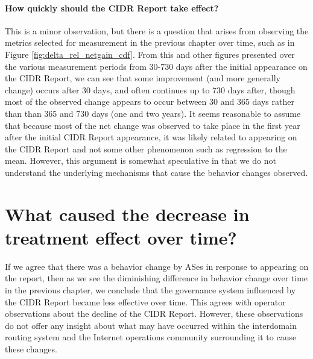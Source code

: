 \paragraph{How quickly should the CIDR Report take effect?}

This is a minor observation, but there is a question that arises from observing
the metrics selected for measurement in the previous chapter over time, such as
in Figure \ref{fig:delta_rel_netgain_cdf}. From this and other figures
presented over the various measurement periods from 30-730 days after the
initial appearance on the CIDR Report, we can see that some improvement (and
more generally change) occurs after 30 days, and often continues up to 730 days
after, though most of the observed change appears to occur between 30 and 365
days rather than than 365 and 730 days (one and two years). It seems reasonable
to assume that because most of the net change was observed to take place in the
first year after the initial CIDR Report appearance, it was likely related to
appearing on the CIDR Report and not some other phenomenon such as regression
to the mean. However, this argument is somewhat speculative in that we do not
understand the underlying mechanisms that cause the behavior changes observed.


\section{What caused the decrease in treatment effect over time?}
If we agree that there was a behavior change by ASes in response to appearing
on the report, then as we see the diminishing difference in behavior change
over time in the previous chapter, we conclude that the governance system
influenced by the CIDR Report became less effective over time. This agrees with
operator observations about the decline of the CIDR Report. However, these
observations do not offer any insight about what may have occurred within the
interdomain routing system and the Internet operations community surrounding it
to cause these changes.

